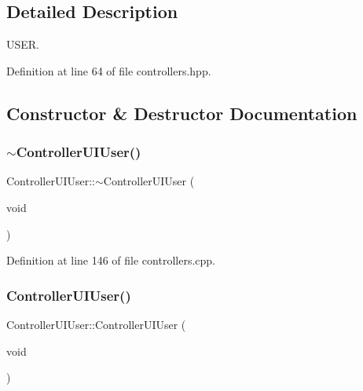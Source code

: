 \subsection{Detailed Description}
U\+S\+ER. 

Definition at line 64 of file controllers.\+hpp.



\subsection{Constructor \& Destructor Documentation}
\mbox{\label{class_controller_u_i_user_a1bc1cdf0a434adb9211341ddaea89cbd}} 
\subsubsection{\texorpdfstring{$\sim$\+Controller\+U\+I\+User()}{~ControllerUIUser()}}
{\footnotesize\ttfamily Controller\+U\+I\+User\+::$\sim$\+Controller\+U\+I\+User (\begin{DoxyParamCaption}\item[{void}]{ }\end{DoxyParamCaption})}



Definition at line 146 of file controllers.\+cpp.

\mbox{\label{class_controller_u_i_user_a84d2a2ab0a27ce9c81dad0b1ba020492}} 
\subsubsection{\texorpdfstring{Controller\+U\+I\+User()}{ControllerUIUser()}}
{\footnotesize\ttfamily Controller\+U\+I\+User\+::\+Controller\+U\+I\+User (\begin{DoxyParamCaption}\item[{void}]{ }\end{DoxyParamCaption})}



